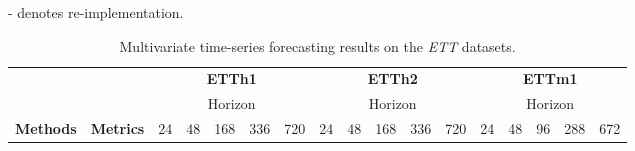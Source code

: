 \documentclass{article}
\begin{document}
\begin{table*}[h]
{\begin{tabular}{ccllllllllllllll|l}
\end{tabular}
}
\begin{tablenotes} \tiny
		\item -  denotes re-implementation.
 \end{tablenotes} \label{tab:longterm}
\end{table*}


\begin{table*}[htbp]	
\caption{Multivariate time-series forecasting results on the \emph{ETT} datasets.}
\begin{threeparttable}
  \resizebox{\textwidth}{!}
{
\begin{tabular}{c|c|c|c|c|c|c|c|c|c|c|c|c|c|c|c|c}
\hline
                                   &                                    & \multicolumn{5}{c|}{\textbf{ETTh1}}                                                                                                                      & \multicolumn{5}{c|}{\textbf{ETTh2}}                                                                                                                      & \multicolumn{5}{c}{\textbf{ETTm1}}                                                                                                                      \\ \cline{3-17} 
                                   &                                    & \multicolumn{5}{c|}{Horizon}                                                                                                                             & \multicolumn{5}{c|}{Horizon}                                                                                                                             & \multicolumn{5}{c}{Horizon}                                                                                                                             \\ \cline{3-17} 
\multirow{-3}{*}{\textbf{Methods}} & \multirow{-3}{*}{\textbf{Metrics}} & 24                           & 48                           & 168                          & 336                          & 720                          & 24                           & 48                           & 168                          & 336                          & 720                          & 24                           & 48                           & 96                           & 288                          & 672                          \\ \hline

\end{tabular}}
\end{threeparttable}
\end{table*}
\end{document}
